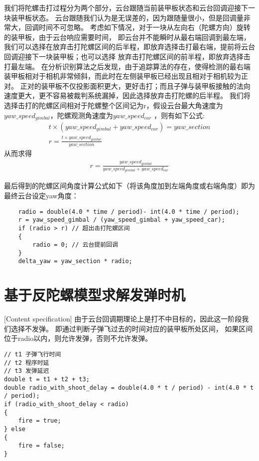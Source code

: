 我们将陀螺击打过程分为两个部分，云台跟随当前装甲板状态和云台回调迎接下一块装甲板状态。
云台跟随我们认为是无误差的，因为跟随量很小，但是回调量非常大，回调时间不可忽略。
考虑如下情况，对于一块从左向右（陀螺方向）旋转的装甲板，由于云台响应需要时间，
即云台并不能瞬时从最右端回调到最左端，
我们可以选择在放弃击打陀螺区间的后半程，即放弃选择击打最右端，提前将云台回调迎接下一块装甲板；也可以选择
放弃击打陀螺区间的前半程，即放弃选择击打最左端。
在分析识别算法之后发现，由于追踪算法的存在，使得检测的最右端装甲板相对于相机非常倾斜，而此时在左侧装甲板已经出现且相对于相机较为正对。
正对的装甲板不仅投影面积更大，更好击打；而且子弹与装甲板接触的法向速度更大，更不容易被裁判系统漏掉，因此选择放弃击打陀螺的后半程。
我们将选择击打的陀螺区间相对于陀螺整个区间记为r，假设云台最大角速度为$yaw\_speed_{gimbal}$，陀螺观测角速度为$yaw\_speed_{car}$
，则有如下公式:
\begin{gather}
    t  \times (yaw\_speed_{gimbal} + yaw\_speed_{car}) = yaw\_section \\
    r = \frac{t \times yaw\_speed_{gimbal} }{yaw\_section}
\end{gather}
从而求得
\begin{gather}
    r = \frac{yaw\_speed_{gimbal}}{yaw\_speed_{gimbal} + yaw\_speed_{car}}
\end{gather}

最后得到的陀螺区间角度计算公式如下（将该角度加到左端角度或右端角度）即为最终云台设定yaw角度：
\begin{lstlisting}
    radio = double(4.0 * time / period)- int(4.0 * time / period);
    r = yaw_speed_gimbal / (yaw_speed_gimbal + yaw_speed_car);
    if (radio > r) // 超出击打陀螺区间
    {
        radio = 0; // 云台提前回调
    }
    delta_yaw = yaw_section * radio;
\end{lstlisting}

\section{基于反陀螺模型求解发弹时机}[Content specification]
由于云台回调期理论上是打不中目标的，因此这一阶段我们选择不发弹。
即通过判断子弹飞过去的时间对应的装甲板所处区间，
如果区间位于radio以内，则允许发弹，否则不允许发弹。
\begin{lstlisting}
// t1 子弹飞行时间
// t2 程序时延
// t3 发弹延迟
double t = t1 + t2 + t3;
double radio_with_shoot_delay = double(4.0 * t / period) - int(4.0 * t / period);
if (radio_with_shoot_delay < radio)
{
    fire = true;
} else
{
    fire = false;
}
\end{lstlisting}



